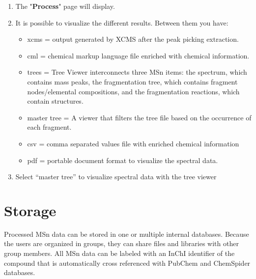 \documentclass[12pt]{report}
\begin{document}
\begin{enumerate}
\begin{center}
\begin{figure}[H]
\end{figure}
\end{center}

\item The "\textbf{Process}" page will display.
\item It is possible to visualize the different results. Between them you have:
\begin{itemize}
    \item xcms = output generated by XCMS after the peak picking extraction.
	\item cml = chemical markup language file enriched with chemical information.
	\item trees = Tree Viewer interconnects three MSn items: the spectrum, which
contains mass peaks, the fragmentation tree, which contains fragment nodes/elemental compositions, and the fragmentation reactions, which contain structures.
	\item master tree = A viewer that filters the tree file based on the occurrence
of each fragment.
	\item csv = comma separated values file with enriched chemical information
	\item pdf = portable document format to visualize the spectral data.
\end{itemize}

\item Select “master tree” to visualize spectral data with the tree viewer

\begin{center}
\begin{figure}[H]
\end{figure}
\end{center}
\end{enumerate}
 
\newpage
\section{Storage}
\newline

Processed MSn data can be stored in one or multiple internal databases. Because the users are organized in groups, they can share files and libraries with other group members. All MSn data can be labeled with an InChI identifier of the compound that is automatically cross referenced with PubChem and ChemSpider databases. 
\end{document}

